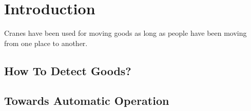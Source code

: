 \documentclass[12pt,a4paper,oneside,pdftex]{report}
\begin{document}




\chapter{Introduction}
\label{chapter:introduction}

Cranes have been used for moving goods as long as people have been moving from one place to another.

\section{How To Detect Goods?}

\section{Towards Automatic Operation}
\end{document}
